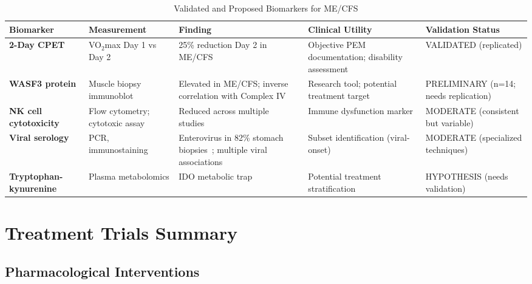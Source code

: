 \begin{table}[htbp]
\centering
\caption{Validated and Proposed Biomarkers for ME/CFS}
\label{tab:biomarker-summary}
\scriptsize
\begin{tabular}{p{2.5cm}p{2cm}p{4cm}p{2.5cm}p{2cm}}
\toprule
\textbf{Biomarker} & \textbf{Measurement} & \textbf{Finding} & \textbf{Clinical Utility} & \textbf{Validation Status} \\
\midrule
\textbf{2-Day CPET} & VO$_2$max Day 1 vs Day 2 & 25\% reduction Day 2 in ME/CFS~\cite{Lim2020} & Objective PEM documentation; disability assessment & VALIDATED (replicated) \\
\midrule
\textbf{WASF3 protein} & Muscle biopsy immunoblot & Elevated in ME/CFS; inverse correlation with Complex IV~\cite{wang2023wasf3} & Research tool; potential treatment target & PRELIMINARY (n=14; needs replication) \\
\midrule
\textbf{NK cell cytotoxicity} & Flow cytometry; cytotoxic assay & Reduced across multiple studies~\cite{Bulbule2024} & Immune dysfunction marker & MODERATE (consistent but variable) \\
\midrule
\textbf{Viral serology} & PCR, immunostaining & Enterovirus in 82\% stomach biopsies~\cite{Chia2005}; multiple viral associations~\cite{hwang2023viral} & Subset identification (viral-onset) & MODERATE (specialized techniques) \\
\midrule
\textbf{Tryptophan-kynurenine} & Plasma metabolomics & IDO metabolic trap~\cite{phair2019ido} & Potential treatment stratification & HYPOTHESIS (needs validation) \\
\bottomrule
\end{tabular}
\end{table}

\section{Treatment Trials Summary}
\label{sec:treatment-trials-summary}

\subsection{Pharmacological Interventions}
\label{subsec:pharmacological-trials}

